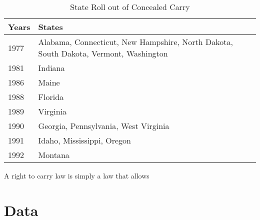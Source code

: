 \documentclass{article}
\begin{document}
\begin{table}[H]
\caption{\label{tab:rollout}State Roll out of Concealed Carry}
\centering
\begin{tabular}[t]{ll}
\toprule
Years & States\\
\midrule
1977 & Alabama, Connecticut, New Hampshire, North Dakota, South Dakota, Vermont, Washington\\
1981 & Indiana\\
1986 & Maine\\
1988 & Florida\\
1989 & Virginia\\
1990 & Georgia, Pennsylvania, West Virginia\\
1991 & Idaho, Mississippi, Oregon\\
1992 & Montana\\
\bottomrule
\end{tabular}
\end{table}
A right to carry law is simply a law that allows
\section*{Data}
\end{document}
